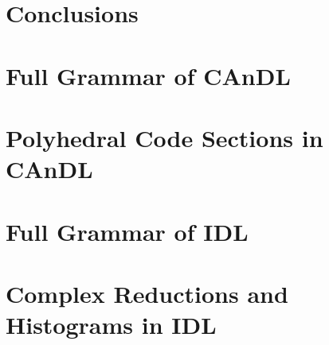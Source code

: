 \documentclass[phd,icsa,twoside,logo,11pt]{infthesis}
\begin{document}
\chapter{Conclusions}
    \label{chapter:conclusion}
    




\begin{appendices}
\chapter{Full Grammar of CAnDL}
    \label{appendix:CAnDLgrammar}
    
\chapter{Polyhedral Code Sections in CAnDL}
    \label{appendix:CAnDLpoly}
    
\chapter{Full Grammar of IDL}
    \label{appendix:IDLgrammar}
    
\chapter{Complex Reductions and Histograms in IDL}
    \label{appendix:IDLreductions}
    
\end{appendices}
\end{document}
